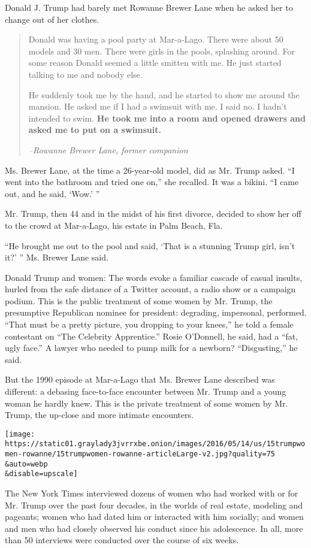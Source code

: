 Donald J. Trump had barely met Rowanne Brewer Lane when he asked her to
change out of her clothes.

\begin{quote}
Donald was having a pool party at Mar-a-Lago. There were about 50 models
and 30 men. There were girls in the pools, splashing around. For some
reason Donald seemed a little smitten with me. He just started talking
to me and nobody else.

He suddenly took me by the hand, and he started to show me around the
mansion. He asked me if I had a swimsuit with me. I said no. I hadn't
intended to swim. \textbf{He took me into a room and opened drawers and
asked me to put on a swimsuit.}

\emph{--Rowanne Brewer Lane, former companion}
\end{quote}

Ms. Brewer Lane, at the time a 26-year-old model, did as Mr. Trump
asked. ``I went into the bathroom and tried one on,'' she recalled. It
was a bikini. ``I came out, and he said, `Wow.' ''

Mr. Trump, then 44 and in the midst of his first divorce, decided to
show her off to the crowd at Mar-a-Lago, his estate in Palm Beach, Fla.

``He brought me out to the pool and said, `That is a stunning Trump
girl, isn't it?' '' Ms. Brewer Lane said.

Donald Trump and women: The words evoke a familiar cascade of casual
insults, hurled from the safe distance of a Twitter account, a radio
show or a campaign podium. This is the public treatment of some women by
Mr. Trump, the presumptive Republican nominee for president: degrading,
impersonal, performed. ``That must be a pretty picture, you dropping to
your knees,'' he told a female contestant on ``The Celebrity
Apprentice.'' Rosie O'Donnell, he said, had a ``fat, ugly face.'' A
lawyer who needed to pump milk for a newborn? ``Disgusting,'' he said.

But the 1990 episode at Mar-a-Lago that Ms. Brewer Lane described was
different: a debasing face-to-face encounter between Mr. Trump and a
young woman he hardly knew. This is the private treatment of some women
by Mr. Trump, the up-close and more intimate encounters.

\texttt{[image: https://static01.graylady3jvrrxbe.onion/images/2016/05/14/us/15trumpwomen-rowanne/15trumpwomen-rowanne-articleLarge-v2.jpg?quality=75\\\&auto=webp\\\&disable=upscale]}

The New York Times interviewed dozens of women who had worked with or
for Mr. Trump over the past four decades, in the worlds of real estate,
modeling and pageants; women who had dated him or interacted with him
socially; and women and men who had closely observed his conduct since
his adolescence. In all, more than 50 interviews were conducted over the
course of six weeks.

